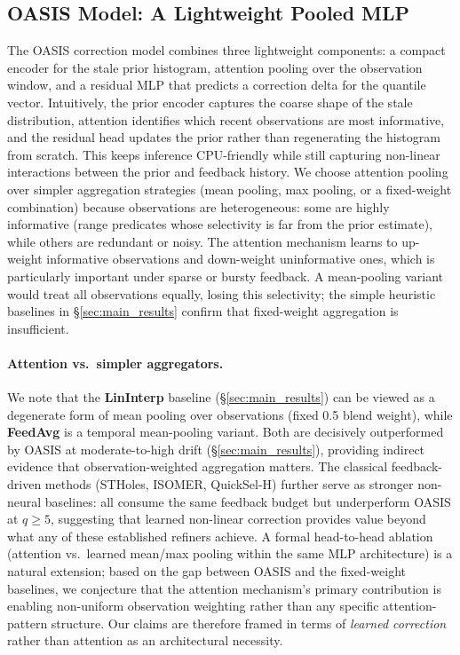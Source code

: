 \documentclass[runningheads]{llncs}
\begin{document}
\subsection{OASIS Model: A Lightweight Pooled MLP}
\label{sec:mlp}

The OASIS correction model combines three lightweight components: a compact
encoder for the stale prior histogram, attention pooling over the observation
window, and a residual MLP that predicts a correction delta for the quantile
vector. Intuitively, the prior encoder captures the coarse shape of the stale
distribution, attention identifies which recent observations are most
informative, and the residual head updates the prior rather than regenerating
the histogram from scratch. This keeps inference CPU-friendly while still
capturing non-linear interactions between the prior and feedback history.
We choose attention pooling over simpler aggregation strategies (mean pooling, max pooling, or a fixed-weight combination) because observations are heterogeneous: some are highly informative (range predicates whose selectivity is far from the prior estimate), while others are redundant or noisy. The attention mechanism learns to up-weight informative observations and down-weight uninformative ones, which is particularly important under sparse or bursty feedback. A mean-pooling variant would treat all observations equally, losing this selectivity; the simple heuristic baselines in \S\ref{sec:main_results} confirm that fixed-weight aggregation is insufficient.

\paragraph{Attention vs.\ simpler aggregators.}
We note that the \textbf{LinInterp} baseline (\S\ref{sec:main_results}) can be viewed as a degenerate form of mean pooling over observations (fixed 0.5 blend weight), while \textbf{FeedAvg} is a temporal mean-pooling variant. Both are decisively outperformed by OASIS at moderate-to-high drift (\S\ref{sec:main_results}), providing indirect evidence that observation-weighted aggregation matters. The classical feedback-driven methods (STHoles, ISOMER, QuickSel-H) further serve as stronger non-neural baselines: all consume the same feedback budget but underperform OASIS at $q{\geq}5$, suggesting that learned non-linear correction provides value beyond what any of these established refiners achieve. A formal head-to-head ablation (attention vs.\ learned mean/max pooling within the same MLP architecture) is a natural extension; based on the gap between OASIS and the fixed-weight baselines, we conjecture that the attention mechanism's primary contribution is enabling non-uniform observation weighting rather than any specific attention-pattern structure. Our claims are therefore framed in terms of \emph{learned correction} rather than attention as an architectural necessity.
\end{document}
